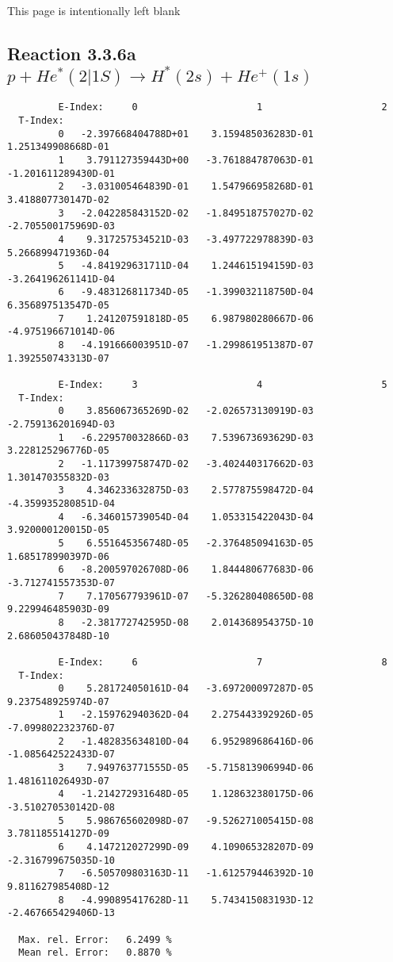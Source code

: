 \newpage
This page is intentionally left blank
\newpage

\subsection{
Reaction 3.3.6a $   p + He^*(2|1S) \rightarrow H^*(2s) + He^+(1s) $
}


\begin{verbatim}
         E-Index:     0                     1                     2
  T-Index:
         0   -2.397668404788D+01    3.159485036283D-01    1.251349908668D-01
         1    3.791127359443D+00   -3.761884787063D-01   -1.201611289430D-01
         2   -3.031005464839D-01    1.547966958268D-01    3.418807730147D-02
         3   -2.042285843152D-02   -1.849518757027D-02   -2.705500175969D-03
         4    9.317257534521D-03   -3.497722978839D-03    5.266899471936D-04
         5   -4.841929631711D-04    1.244615194159D-03   -3.264196261141D-04
         6   -9.483126811734D-05   -1.399032118750D-04    6.356897513547D-05
         7    1.241207591818D-05    6.987980280667D-06   -4.975196671014D-06
         8   -4.191666003951D-07   -1.299861951387D-07    1.392550743313D-07

         E-Index:     3                     4                     5
  T-Index:
         0    3.856067365269D-02   -2.026573130919D-03   -2.759136201694D-03
         1   -6.229570032866D-03    7.539673693629D-03    3.228125296776D-05
         2   -1.117399758747D-02   -3.402440317662D-03    1.301470355832D-03
         3    4.346233632875D-03    2.577875598472D-04   -4.359935280851D-04
         4   -6.346015739054D-04    1.053315422043D-04    3.920000120015D-05
         5    6.551645356748D-05   -2.376485094163D-05    1.685178990397D-06
         6   -8.200597026708D-06    1.844480677683D-06   -3.712741557353D-07
         7    7.170567793961D-07   -5.326280408650D-08    9.229946485903D-09
         8   -2.381772742595D-08    2.014368954375D-10    2.686050437848D-10

         E-Index:     6                     7                     8
  T-Index:
         0    5.281724050161D-04   -3.697200097287D-05    9.237548925974D-07
         1   -2.159762940362D-04    2.275443392926D-05   -7.099802232376D-07
         2   -1.482835634810D-04    6.952989686416D-06   -1.085642522433D-07
         3    7.949763771555D-05   -5.715813906994D-06    1.481611026493D-07
         4   -1.214272931648D-05    1.128632380175D-06   -3.510270530142D-08
         5    5.986765602098D-07   -9.526271005415D-08    3.781185514127D-09
         6    4.147212027299D-09    4.109065328207D-09   -2.316799675035D-10
         7   -6.505709803163D-11   -1.612579446392D-10    9.811627985408D-12
         8   -4.990895417628D-11    5.743415083193D-12   -2.467665429406D-13

  Max. rel. Error:   6.2499 %
  Mean rel. Error:   0.8870 %


\end{verbatim}


